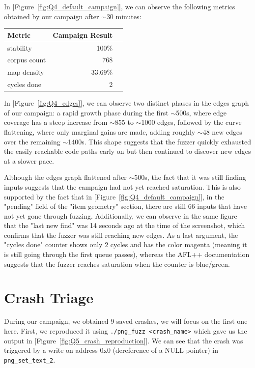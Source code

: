 In [Figure~\ref{fig:Q4_default_campaign}], we can observe the following metrics obtained by our campaign after $\sim$30 minutes: 
\begin{center}
\begin{tabular}{lrr}
\hline
\textbf{Metric} & \textbf{Campaign Result} \\\hline
stability     & 100\% \\
corpus count  & 768 \\
map density   & 33.69\%  \\
cycles done & 2      \\
\hline
\end{tabular}
\end{center}

In [Figure~\ref{fig:Q4_edges}], we can observe two distinct phases in the edges graph of our campaign: a rapid growth phase during the first $\sim$500s, where edge coverage has a steep increase from $\sim$855 to $\sim$1000 edges, followed by the curve flattening, where only marginal gains are made, adding roughly $\sim$48 new edges over the remaining $\sim$1400s. This shape suggests that the fuzzer quickly exhausted the easily reachable code paths early on but then continued to discover new edges at a slower pace.

Although the edges graph flattened after $\sim$500s, the fact that it was still finding inputs suggests that the campaign had not yet reached saturation. This is also supported by the fact that in [Figure~\ref{fig:Q4_default_campaign}], in the "pending" field of the "item geometry" section, there are still 66 inputs that have not yet gone through fuzzing. Additionally, we can observe in the same figure that the "last new find" was 14 seconds ago at the time of the screenshot, which confirms that the fuzzer was still reaching new edges. As a last argument, the "cycles done" counter shows only 2 cycles and has the color magenta (meaning it is still going through the first queue passes), whereas the AFL++ documentation\cite{aflplusplus_approach} suggests that the fuzzer reaches saturation when the counter is blue/green.

\section{Crash Triage}

During our campaign, we obtained 9 saved crashes, we will focus on the first one here. First, we reproduced it using \texttt{./png\_fuzz <crash\_name>} which gave us the output in [Figure~\ref{fig:Q5_crash_reproduction}]. We can see that the crash was triggered by a write on address 0x0 (dereference of a NULL pointer) in \texttt{png\_set\_text\_2}. 

